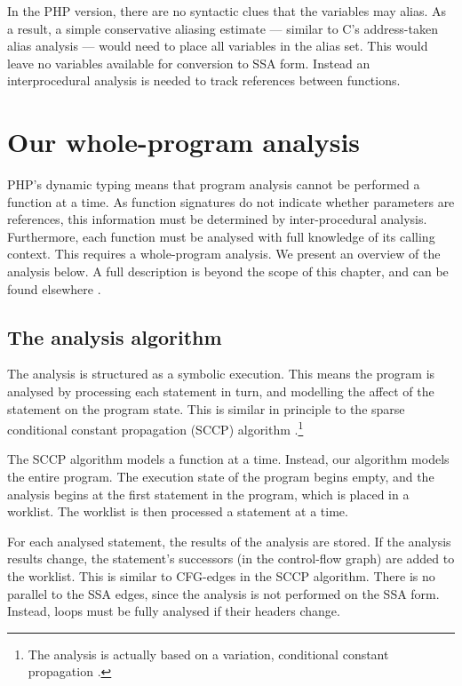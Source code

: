 In the PHP version, there are no syntactic clues that the variables
may alias.  As a result, a simple conservative aliasing estimate ---
similar to C's address-taken alias analysis --- would need to place
all variables in the alias set.  This would leave no variables
available for conversion to SSA form. Instead an interprocedural
analysis is needed to track references between functions.


\section{Our whole-program analysis}

PHP's dynamic typing means that program analysis cannot be performed a
function at a time.  As function signatures do not indicate whether
parameters are references, this information must be determined by
inter-procedural analysis.  Furthermore, each function must be
analysed with full knowledge of its calling context.  This requires a
whole-program analysis. We present an overview of the analysis below.
A full description is beyond the scope of this chapter, and can be
found elsewhere \cite{Biggar2010}.

\subsection{The analysis algorithm}
The analysis is structured as a symbolic execution.  This means the
program is analysed by processing each statement in turn, and
modelling the affect of the statement on the program state.  This is
similar in principle to the sparse conditional constant propagation
(SCCP) algorithm .\footnote{The analysis is actually
  based on a variation, conditional constant propagation
  \cite{Pioli99}.}


The SCCP algorithm models a function at a time.  Instead, our
algorithm models the entire program.  The execution state of the
program begins empty, and the analysis begins at the first statement
in the program, which is placed in a worklist.  The worklist is then
processed a statement at a time.

For each analysed statement, the results of the analysis are stored.
If the analysis results change, the statement's successors (in the
control-flow graph) are added to the worklist. This is similar to
CFG-edges in the SCCP algorithm.  There is no parallel to the SSA
edges, since the analysis is not performed on the SSA form.  Instead,
loops must be fully analysed if their headers change.

